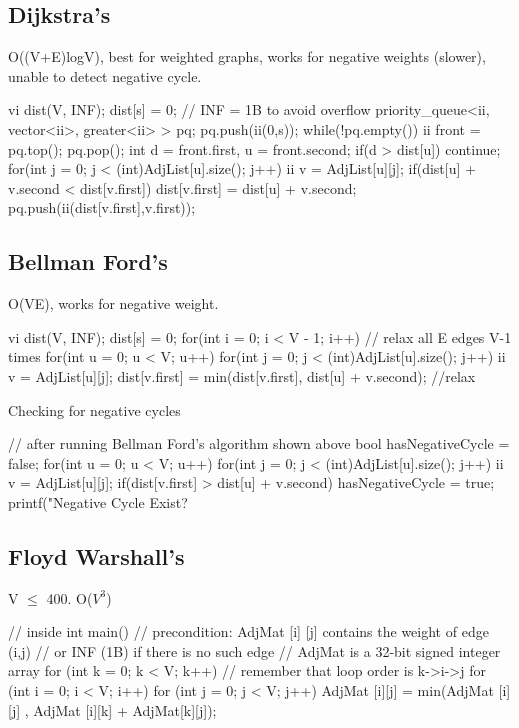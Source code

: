 \documentclass{article}
\begin{document}
\subsection{Dijkstra's}
O((V+E)logV), best for weighted graphs, works for negative weights (slower), unable to detect negative cycle.
\begin{mylisting}{}
vi dist(V, INF); dist[s] = 0;		// INF = 1B to avoid overflow
priority_queue<ii, vector<ii>, greater<ii> > pq; pq.push(ii(0,s));
while(!pq.empty()){
	ii front = pq.top(); pq.pop();	
	int d = front.first, u = front.second;
	if(d > dist[u]) continue;		
	for(int j = 0; j < (int)AdjList[u].size(); j++){
		ii v = AdjList[u][j];	
		if(dist[u] + v.second < dist[v.first]){
			dist[v.first] = dist[u] + v.second;	
			pq.push(ii(dist[v.first],v.first));
		}
	}
}
\end{mylisting}

\subsection{Bellman Ford's}
O(VE), works for negative weight.
\begin{mylisting}{}
vi dist(V, INF); dist[s] = 0;
for(int i = 0; i < V - 1; i++){		// relax all E edges V-1 times
	for(int u = 0; u < V; u++){
		for(int j = 0; j < (int)AdjList[u].size(); j++){
			ii v = AdjList[u][j];
			dist[v.first] = min(dist[v.first], dist[u] + v.second);	
		} //relax
	}
}
\end{mylisting}
\pagebreak
Checking for negative cycles
\begin{mylisting}{}
// after running Bellman Ford's algorithm shown above
bool hasNegativeCycle = false;
for(int u = 0; u < V; u++){
	for(int j = 0; j < (int)AdjList[u].size(); j++){
		ii v = AdjList[u][j];
		if(dist[v.first] > dist[u] + v.second)
			hasNegativeCycle = true;	
	}
}
printf("Negative Cycle Exist? %
\end{mylisting}

\subsection{Floyd Warshall's}
V $\leq$ 400. O(\(V^3\))
\begin{mylisting}{}
// inside int main()
// precondition: AdjMat [i] [j] contains the weight of edge (i,j)  
// or INF (1B) if there is no such edge
// AdjMat is a 32-bit signed integer array
for (int k = 0; k < V; k++) // remember that loop order is k->i->j
	for (int i = 0; i < V; i++)
		for (int j = 0; j < V; j++)
			AdjMat [i][j] = min(AdjMat [i][j] , AdjMat [i][k] + AdjMat[k][j]);
\end{mylisting}
\end{document}
